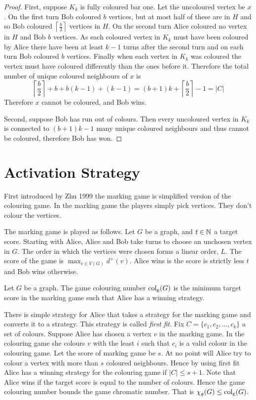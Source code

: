 \begin{proof}
First, suppose $K_k$ is fully coloured bar one. Let the uncoloured vertex be $x$. On the first turn Bob coloured $b$ vertices, but at most half of these are in $H$ and so Bob coloured $\left\lceil \frac{b}{2}\right\rceil$ vertices in $H$. On the second turn Alice coloured no vertex in $H$ and Bob $b$ vertices. As each coloured vertex in $K_k$ must have been coloured by Alice there have been at least $k-1$ turns after the second turn and on each turn Bob coloured $b$ vertices. Finally when each vertex in $K_k$ was coloured the vertex must have coloured differently than the ones before it. Therefore the total number of unique coloured neighbours of $x$ is 
%
\[\left\lceil \frac{b}{2}\right\rceil+b +b(k-1)+(k-1)=(b+1)k+\left\lceil \frac{b}{2}\right\rceil-1 = |C|\]
%
Therefore $x$ cannot be coloured, and Bob wins.

Second, suppose Bob has run out of colours. Then every uncoloured vertex in $K_k$ is connected to $(b+1)k-1$ many unique coloured neighbours and thus cannot be coloured, therefore Bob has won.
\end{proof}

\section{Activation Strategy}

First introduced by  Zhu 1999 \cite{Zhu1999} the marking game is simplified version of the colouring game. In the marking game the players simply pick vertices. They don't colour the vertices. 

The marking game is played as follows. Let $G$ be a graph, and $t\in\mathbb{N}$ a target score. Starting with Alice, Alice and Bob take turns to choose an unchosen vertex in $G$. The order in which the vertices were chosen forms a linear order, $L$. The score of the game is $\max_{v\in V(G)}d^+(v)$. Alice wins is the score is strictly less $t$ and Bob wins otherwise. 
%
\begin{definition}
    Let $G$ be a graph. The game colouring number $\operatorname{col_g}(G)$ is the minimum target score in the marking game such that Alice has a winning strategy. 
\end{definition}
%

There is simple strategy for Alice that takes a strategy for the marking game and converts it to a strategy. This strategy is called \textit{first fit}. Fix $C=\{c_1,c_2,\dots,c_k\}$ a set of colours. Suppose Alice has chosen a vertex $v$ in the marking game. In the colouring game she colours $v$ with the least $i$ such that $c_i$ is a valid colour in the colouring game. Let the score of marking game be $s$. At no point will Alice try to colour a vertex with more than $s$ coloured neighbours. Hence by using first fit Alice has a winning strategy for the colouring game if $|C|\leq s+1$. Note that Alice wins if the target score is equal to the number of colours. Hence the game colouring number bounds the game chromatic number. That is $\chi_g(G)\leq\operatorname{col_g}(G)$.


